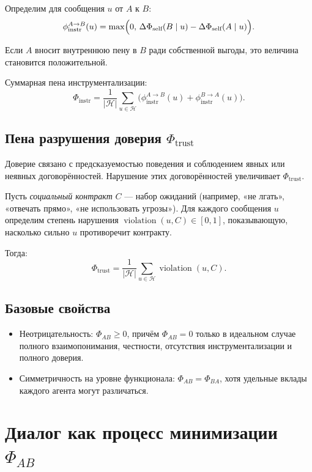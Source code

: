 \documentclass[11pt,a4paper]{article}
\begin{document}
Определим для сообщения \(u\) от \(A\) к \(B\):
\[
  \phi_{\text{instr}}^{A\to B}(u) =
  \max\Bigl(
    0,\,
    \Delta\Phi_{\text{self}}(B\mid u) - \Delta\Phi_{\text{self}}(A\mid u)
  \Bigr).
\]

Если \(A\) вносит внутреннюю пену в \(B\) ради собственной выгоды,
это величина становится положительной.

Суммарная пена инструментализации:
\[
  \Phi_{\text{instr}} =
  \frac{1}{|\mathcal{H}|}
  \sum_{u \in \mathcal{H}}
  \bigl(
    \phi_{\text{instr}}^{A\to B}(u) +
    \phi_{\text{instr}}^{B\to A}(u)
  \bigr).
\]

\subsection{Пена разрушения доверия \texorpdfstring{\(\Phi_{\text{trust}}\)}{Φ\_trust}}

Доверие связано с предсказуемостью поведения и соблюдением явных
или неявных договорённостей. Нарушение этих договорённостей увеличивает
\(\Phi_{\text{trust}}\).

Пусть \emph{социальный контракт} \(C\) — набор ожиданий
(например, «не лгать», «отвечать прямо», «не использовать угрозы»).
Для каждого сообщения \(u\) определим степень нарушения
\(\operatorname{violation}(u, C) \in [0,1]\), показывающую, насколько
сильно \(u\) противоречит контракту.

Тогда:
\[
  \Phi_{\text{trust}} =
  \frac{1}{|\mathcal{H}|}
  \sum_{u \in \mathcal{H}} \operatorname{violation}(u, C).
\]

\subsection{Базовые свойства}

\begin{itemize}
  \item Неотрицательность:
        \(\Phi_{AB} \ge 0\), причём \(\Phi_{AB} = 0\) только в
        идеальном случае полного взаимопонимания, честности,
        отсутствия инструментализации и полного доверия.
  \item Симметричность на уровне функционала:
        \(\Phi_{AB} = \Phi_{BA}\), хотя удельные вклады каждого
        агента могут различаться.
\end{itemize}

\section{Диалог как процесс минимизации \texorpdfstring{\(\Phi_{AB}\)}{Φ\_AB}}
\end{document}
